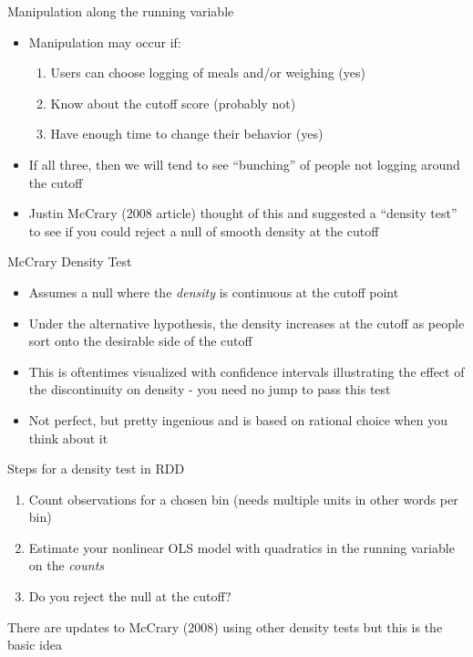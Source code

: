 \documentclass{beamer}
\begin{document}
\begin{frame}{Manipulation along the running variable}

\begin{itemize}
	\item Manipulation may occur if:
		\begin{enumerate}
		\item Users can choose logging of meals and/or weighing (yes)
		\item Know about the cutoff score (probably not)
		\item Have enough time to change their behavior (yes)
		\end{enumerate}
	\item If all three, then we will tend to see ``bunching'' of people not logging around the cutoff
	\item Justin McCrary (2008 article) thought of this and suggested a ``density test'' to see if you could reject a null of smooth density at the cutoff 
\end{itemize}

\end{frame}


\begin{frame}{McCrary Density Test}

	\begin{itemize}
	\item Assumes a null where the \emph{density} is continuous at the cutoff point 
	\item Under the alternative hypothesis, the density increases at the cutoff as people sort onto the desirable side of the cutoff
	\item This is oftentimes visualized with confidence intervals illustrating the effect of the discontinuity on density - you need no jump to pass this test
	\item Not perfect, but pretty ingenious and is based on rational choice when you think about it
	\end{itemize}

\end{frame}

\begin{frame}{Steps for a density test in RDD}

		\begin{enumerate}
		\item Count observations for a chosen bin (needs multiple units in other words per bin)
		\item Estimate your nonlinear OLS model with quadratics in the running variable on the \emph{counts}
		\item Do you reject the null at the cutoff?
		\end{enumerate}There are updates to McCrary (2008) using other density tests but this is the basic idea
\end{frame}
\end{document}
